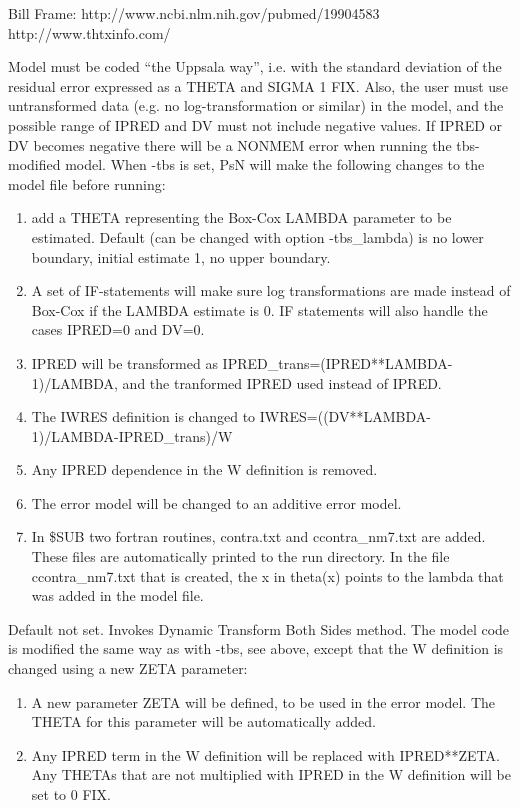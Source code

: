 \begin{optionlist}
Bill Frame: http://www.ncbi.nlm.nih.gov/pubmed/19904583
 http://www.thtxinfo.com/
 
 Model must be coded “the Uppsala way”, i.e. with the standard deviation of the residual error expressed as a THETA and SIGMA 1 FIX. 
Also, the user must use untransformed data (e.g. no log-transformation or similar) in the model, and the possible range of IPRED and DV must not include negative values. If IPRED or DV becomes negative there will be a NONMEM error when running the tbs-modified model. 
 When -tbs is set, PsN will make the following changes to the model file before running:
\begin{enumerate}
	\item add a THETA representing the Box-Cox LAMBDA parameter to be estimated. Default (can be changed with option -tbs\_lambda) is no lower boundary, initial estimate 1, no upper boundary.
	\item A set of IF-statements will make sure log transformations are made instead of Box-Cox if the LAMBDA estimate is 0. IF statements will also handle the cases IPRED=0 and DV=0.
	\item IPRED will be transformed as 
 IPRED\_trans=(IPRED**LAMBDA-1)/LAMBDA, 
 and the tranformed  IPRED used instead of IPRED.  
	\item The IWRES definition is changed to 
 IWRES=((DV**LAMBDA-1)/LAMBDA-IPRED\_trans)/W
	\item Any IPRED dependence in the W definition is removed.
	\item The error model will be changed to an additive error model.
	\item In \$SUB two fortran routines, contra.txt and ccontra\_nm7.txt are added. These files are automatically printed to the run directory. In the file ccontra\_nm7.txt that is created, the x in theta(x) points to the lambda that was added in the model file.
\end{enumerate}
\nextopt
{}
Default not set. Invokes Dynamic Transform Both Sides method. The model code is modified the same way as with -tbs, see above, except that the W definition is changed using a new ZETA parameter:
\begin{enumerate}
\item A new parameter ZETA will be defined, to be used in the error model. The THETA for this parameter will be automatically added.
\item Any IPRED term in the W definition will be replaced with IPRED**ZETA.
Any THETAs that are not multiplied with IPRED in the W definition will be set to 0 FIX.

\end{enumerate}
\end{optionlist}

